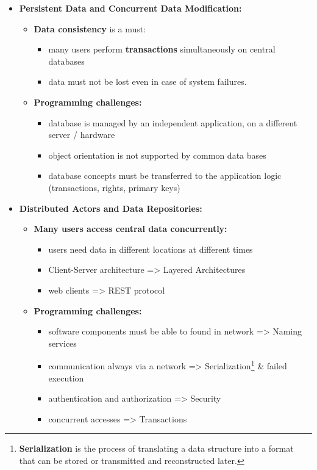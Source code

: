 \documentclass[ieeetran]{article}
\begin{document}
\begin{itemize}
\item \textbf{Persistent Data and Concurrent Data Modification:}
	\begin{itemize}
	  \item \textbf{Data consistency} is a must:
		  \begin{itemize}
		    \item many users perform \textbf{transactions} simultaneously on central databases
		\item data must not be lost even in case of system failures.
		  \end{itemize}
		  \item \textbf{Programming challenges:}
			  \begin{itemize}
			    \item database is managed by an independent application, on a different server / hardware
			\item object orientation is not supported by common data bases
				\item database concepts must be transferred to the application logic (transactions, rights, primary keys)
			  \end{itemize}
	\end{itemize}

\item \textbf{Distributed Actors and Data Repositories:}
	\begin{itemize}
	  \item \textbf{Many users access central data concurrently:}
		  \begin{itemize}
		    \item users need data in different locations at different times
			    \item Client-Server architecture => Layered Architectures
		\item web clients => REST protocol
		  \end{itemize}

	\item \textbf{Programming challenges:}
		\begin{itemize}
		  \item software components must be able to found in network => Naming services
		  \item communication always via a network => Serialization\footnote{\textbf{Serialization} is the process of translating a data structure into a format that can be stored or transmitted and reconstructed later.} \& failed execution
			  \item authentication and authorization => Security
		\item concurrent accesses => Transactions
		\end{itemize}
	\end{itemize}


\end{itemize}
\end{document}
